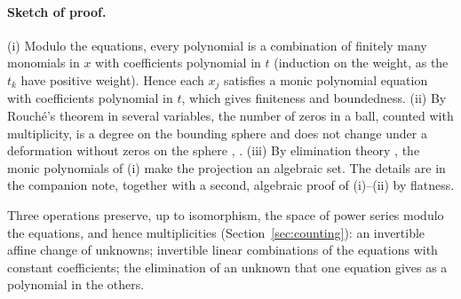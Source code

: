 \paragraph{Sketch of proof.}
(i) Modulo the equations, every polynomial is a combination of finitely
many monomials in \(x\) with coefficients polynomial in \(t\) (induction
on the weight, as the \(t_k\) have positive weight). Hence each \(x_j\)
satisfies a monic polynomial equation with coefficients polynomial in
\(t\), which gives finiteness and boundedness. (ii) By Rouch\'e's
theorem in several variables, the number of zeros in a ball, counted
with multiplicity, is a degree on the bounding sphere and does not
change under a deformation without zeros on the sphere
\citep[Appendix~B]{Milnor1968},
\citep[Sections~5.2 and~5.4]{ArnoldGuseinZadeVarchenko1985}. (iii) By
elimination theory \citep[Chapter~3, \S1]{CoxLittleOSheaIVA}, the monic
polynomials of (i) make the projection an algebraic set. The details
are in the companion note, together with a second, algebraic proof of
(i)--(ii) by flatness.

Three operations preserve, up to isomorphism, the space of power series
modulo the equations, and hence multiplicities
(Section~\ref{sec:counting}): an invertible affine change of unknowns;
invertible linear combinations of the equations with constant
coefficients; the elimination of an unknown that one equation gives as a
polynomial in the others.

